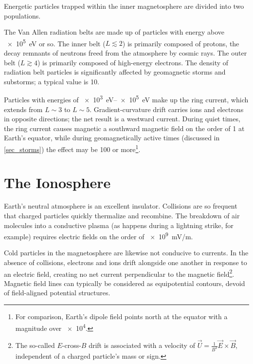 Energetic particles trapped within the inner magnetosphere are divided into two
populations. 

The Van Allen radiation belts are made up of particles with energy above
\SI{e5}{\eV} or so. The inner belt ($L\lesssim2$) is primarily composed of
protons, the decay remnants of neutrons freed from the atmosphere by cosmic
rays. The outer belt ($L\gtrsim4$) is primarily composed of high-energy
electrons. The density of radiation belt particles is significantly affected by
geomagnetic storms and substorms; a typical value is \SI{10}{\percc}. 

Particles with energies of \SIrange{e3}{e5}{\eV} make up the ring current,
which extends from $L\sim3$ to $L\sim5$. Gradient-curvature drift carries ions
and electrons in opposite directions; the net result is a westward current.
During quiet times, the ring current causes magnetic a southward magnetic field
on the order of \SI{1}{\nT} at Earth's equator, while during geomagnetically
active times (discussed in \cref{sec_storms}) the effect may be \SI{100}{\nT}
or more\footnote{For comparison, Earth's dipole field points north at the
equator with a magnitude over \SI{e4}{\nT}. }. 

\section{The Ionosphere}
  \label{sec_ionos}

Earth's neutral atmosphere is an excellent insulator. Collisions are so
frequent that charged particles quickly thermalize and recombine. The breakdown
of air molecules into a conductive plasma (as happens during a lightning
strike, for example) requires electric fields on the order of \SI{e9}{\mV/\m}. 

Cold particles in the magnetosphere are likewise not conducive to currents. In
the absence of collisions, electrons and ions drift alongside one another in
response to an electric field, creating no net current perpendicular to the
magnetic field\footnote{The so-called $E$-cross-$B$ drift is associated with a
velocity of $\vec{U} = \frac{1}{B^2} \vec{E} \times \vec{B}$, independent of a
charged particle's mass or sign. }. Magnetic field lines can typically be
considered as equipotential contours, devoid of field-aligned potential
structures. 


